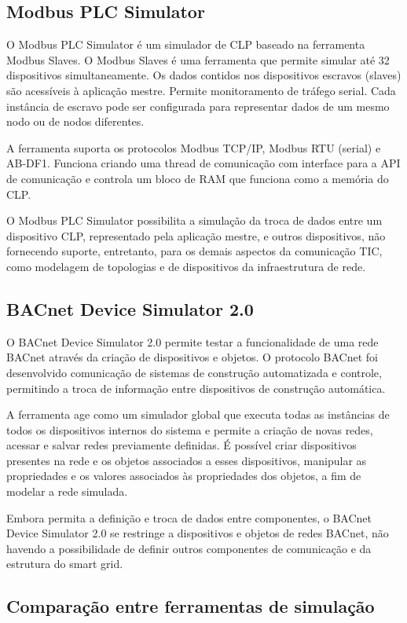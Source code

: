 \documentclass[cic,tc]{iiufrgs}
\begin{document}
\subsection{Modbus PLC Simulator}
O Modbus PLC Simulator \cite{plcsimwebsite} é um simulador de CLP baseado na ferramenta Modbus Slaves. O Modbus Slaves é uma ferramenta que permite simular até 32 dispositivos simultaneamente. Os dados contidos nos dispositivos escravos (slaves) são acessíveis à aplicação mestre. Permite monitoramento de tráfego serial. Cada instância de escravo pode ser configurada para representar dados de um mesmo nodo ou de nodos diferentes.

A ferramenta suporta os protocolos Modbus TCP/IP, Modbus RTU (serial) e AB-DF1. Funciona criando uma thread de comunicação com interface para a API de comunicação e controla um bloco de RAM que funciona como a memória do CLP.

O Modbus PLC Simulator possibilita a simulação da troca de dados entre um dispositivo CLP, representado pela aplicação mestre, e outros dispositivos, não fornecendo suporte, entretanto, para os demais aspectos da comunicação TIC, como modelagem de topologias e de dispositivos da infraestrutura de rede.

\subsection{BACnet Device Simulator 2.0}
O BACnet Device Simulator 2.0 \cite{bacnetwebsite} permite testar a funcionalidade de uma rede BACnet através da criação de dispositivos e objetos. O protocolo BACnet foi desenvolvido comunicação de sistemas de construção automatizada e controle, permitindo a troca de informação entre dispositivos de construção automática.

A ferramenta age como um simulador global que executa todas as instâncias de todos os dispositivos internos do sistema e permite a criação de novas redes, acessar e salvar redes previamente definidas. É possível criar dispositivos presentes na rede e os objetos associados a esses dispositivos, manipular as propriedades e os valores associados às propriedades dos objetos, a fim de modelar a rede simulada.

Embora permita a definição e troca de dados entre componentes, o BACnet Device Simulator 2.0 se restringe a dispositivos e objetos de redes BACnet, não havendo a possibilidade de definir outros componentes de comunicação e da estrutura do smart grid.

\subsection{Comparação entre ferramentas de simulação}
\end{document}
